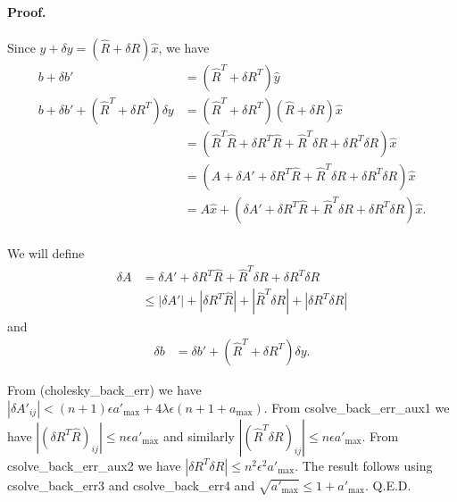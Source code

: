 \documentclass[a4paper]{article}
\begin{document}
\paragraph*{Proof.}
Since $\hat{y} + \delta y = (\hat{R} + \delta R)\hat{x}$, we have
\begin{equation}\tag{xxx}
  \begin{array}{rl}
    b + \delta b' &= (\hat{R}^T+\delta R^T)\hat{y}\\
    b + \delta b' + (\hat{R}^T + \delta R^T) \delta y & = (\hat{R}^T+\delta R^T)(\hat{R}+\delta R)\hat{x} \\
    & = (\hat{R}^T\hat{R}+\delta R^T\hat{R} +\hat{R}^T\delta R  +\delta R^T \delta R)\hat{x} \\
    & = (A + \delta A' +\delta R^T\hat{R} +\hat{R}^T\delta R  +\delta R^T \delta R)\hat{x} \\
    & = A\hat{x} + (\delta A' +\delta R^T\hat{R} +\hat{R}^T\delta R  +\delta R^T \delta R)\hat{x}. \\
  \end{array}
\end{equation}

We will define 
\begin{equation}\tag{xxx}
  \begin{array}{rl}
    \delta A   & = \delta A' +\delta R^T\hat{R} + \hat{R}^T\delta R  + \delta R^T \delta R\\
      & \le |\delta A'| +|\delta R^T\hat{R}| +|\hat{R}^T\delta R|  +|\delta R^T \delta R|
  \end{array}
\end{equation}
and
\begin{equation}\tag{xxx}
  \begin{array}{rl}
    \delta b   & = \delta b' +(\hat{R}^T + \delta R^T) \delta y.
  \end{array}
\end{equation}

From (cholesky\_back\_err) we have
$  |\delta A'_{ij}| < (n+1)\epsilon a'_\mathrm{max}
+ 4 \lambda\epsilon (n+1+a_\mathrm{max}).$\newline
From csolve\_back\_err\_aux1 we have
$|(\delta R^T\hat{R})_{ij}| \le n\epsilon a'_\mathrm{max}$
and similarly 
$|(\hat{R}^T\delta R)_{ij}| \le n\epsilon a'_\mathrm{max}$.\newline
From csolve\_back\_err\_aux2 we have
    $|\delta R^T \delta R|
 \le n^2\epsilon^2 a'_\mathrm{max}$.
\newline
The result follows using csolve\_back\_err3 and csolve\_back\_err4 and $\sqrt{a'_\mathrm{max}} \le 1 + a'_\mathrm{max}$.  Q.E.D.



\end{document}
